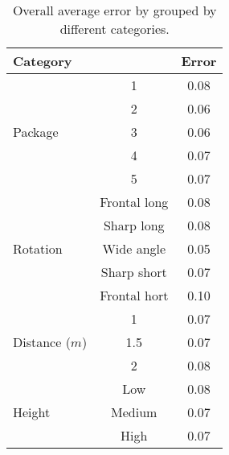 \begin{table}%
\centering
\begin{tabular}{lcc}
\toprule
\multicolumn{2}{l}{Category} & Error\\
\midrule

\multirow{5}{*}{Package} 
& 1 & 0.08  \\
& 2 & 0.06  \\
& 3 & 0.06  \\
& 4 & 0.07  \\
& 5 & 0.07  \\
\midrule

\multirow{5}{*}{Rotation}
& Frontal long		& 0.08 \\ 
& Sharp long		& 0.08 \\
& Wide angle 		& 0.05 \\
& Sharp short 		& 0.07 \\
& Frontal hort		& 0.10 \\
\midrule
\multirow{3}{*}{Distance ($m$)} 
& 1 			& 0.07 \\
& 1.5  			& 0.07 \\
& 2 			& 0.08 \\
\midrule
\multirow{3}{*}{Height} 
& Low 		& 0.08 \\
& Medium 	& 0.07 \\
& High		& 0.07 \\
\bottomrule
 \end{tabular}
 \caption{Overall average error by grouped by different categories.}
\label{table:overall_categories_error}
\end{table}